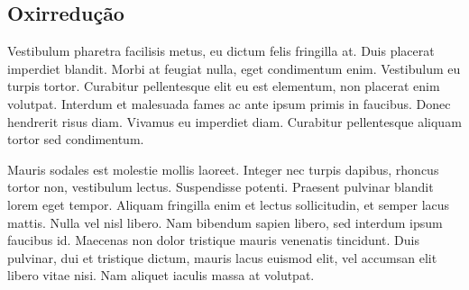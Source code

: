 \documentclass[12pt]{article}
\begin{document}
\begin{multicols*}{2}
        \subsection*{Oxirredução}
        Vestibulum pharetra facilisis metus, eu dictum felis fringilla at. Duis placerat imperdiet blandit. Morbi 
        at feugiat nulla, eget condimentum enim. Vestibulum eu turpis tortor. Curabitur pellentesque elit eu est 
        elementum, non placerat enim volutpat. Interdum et malesuada fames ac ante ipsum primis in faucibus. 
        Donec hendrerit risus diam. Vivamus eu imperdiet diam. Curabitur pellentesque aliquam tortor sed condimentum.

        Mauris sodales est molestie mollis laoreet. Integer nec turpis dapibus, rhoncus tortor non, vestibulum 
        lectus. Suspendisse potenti. Praesent pulvinar blandit lorem eget tempor. Aliquam fringilla enim et lectus 
        sollicitudin, et semper lacus mattis. Nulla vel nisl libero. Nam bibendum sapien libero, sed interdum ipsum 
        faucibus id. Maecenas non dolor tristique mauris venenatis tincidunt. Duis pulvinar, dui et tristique dictum, 
        mauris lacus euismod elit, vel accumsan elit libero vitae nisi. Nam aliquet iaculis massa at volutpat.
        
        
    \end{multicols*}
    
\end{document}
